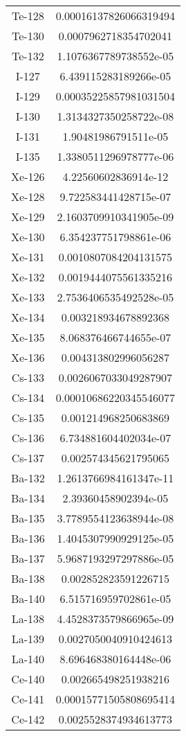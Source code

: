 \begin{table}[h!]
\begin{tabular}{|| c || c |}
Te-128 & 0.00016137826066319494 \\
Te-130 & 0.0007962718354702041 \\
Te-132 & 1.1076367789738552e-05 \\
I-127 & 6.439115283189266e-05 \\
I-129 & 0.00035225857981031504 \\
I-130 & 1.3134327350258722e-08 \\
I-131 & 1.90481986791511e-05 \\
I-135 & 1.3380511296978777e-06 \\
Xe-126 & 4.22560602836914e-12 \\
Xe-128 & 9.722583441428715e-07 \\
Xe-129 & 2.1603709910341905e-09 \\
Xe-130 & 6.354237751798861e-06 \\
Xe-131 & 0.0010807084204131575 \\
Xe-132 & 0.0019444075561335216 \\
Xe-133 & 2.7536406535492528e-05 \\
Xe-134 & 0.003218934678892368 \\
Xe-135 & 8.068376466744655e-07 \\
Xe-136 & 0.004313802996056287 \\
Cs-133 & 0.0026067033049287907 \\
Cs-134 & 0.00010686220345546077 \\
Cs-135 & 0.001214968250683869 \\
Cs-136 & 6.734881604402034e-07 \\
Cs-137 & 0.002574345621795065 \\
Ba-132 & 1.2613766984161347e-11 \\
Ba-134 & 2.39360458902394e-05 \\
Ba-135 & 3.7789554123638944e-08 \\
Ba-136 & 1.4045307990929125e-05 \\
Ba-137 & 5.9687193297297886e-05 \\
Ba-138 & 0.002852823591226715 \\
Ba-140 & 6.515716959702861e-05 \\
La-138 & 4.4528373579866965e-09 \\
La-139 & 0.0027050040910424613 \\
La-140 & 8.696468380164448e-06 \\
Ce-140 & 0.002665498251938216 \\
Ce-141 & 0.00015771505808695414 \\
Ce-142 & 0.0025528374934613773 \\

\end{tabular}
\end{table}
